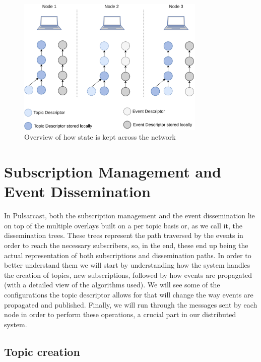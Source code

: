 \begin{figure}[hb!]
  \centering
  \includegraphics[width=0.8\textwidth]{img/pulsarcast-local-vs-distributed-state.png}
  \caption{Overview of how state is kept across the network}
  \label{fig:pulsarcast-local-vs-distributed-state}
\end{figure}

\section{Subscription Management and Event Dissemination}\label{subscription-management-event-dissemination}

In Pulsarcast, both the subscription management and the event dissemination lie
on top of the multiple overlays built on a per topic basis or, as we call it,
the dissemination trees. These trees represent the path traversed by the events
in order to reach the necessary subscribers, so, in the end, these end up being
the actual representation of both subscriptions and dissemination paths. In
order to better understand them we will start by understanding how the system
handles the creation of topics, new subscriptions, followed by how events are
propagated (with a detailed view of the algorithms used). We will see some of
the configurations the topic descriptor allows for that will change the way
events are propagated and published. Finally, we will run through the messages
sent by each node in order to perform these operations, a crucial part in our
distributed system.

\subsection{Topic creation}\label{subsec:topic-creation}

